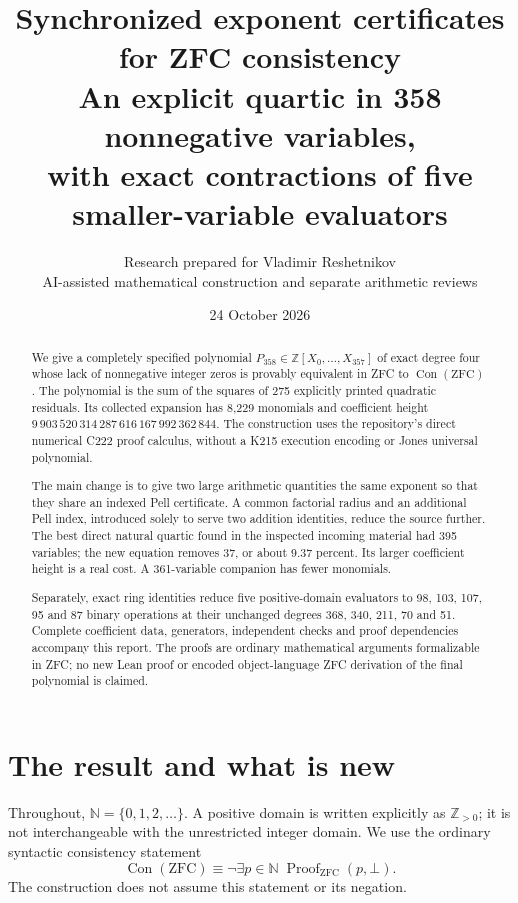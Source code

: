 \documentclass[11pt]{article}
\title{Synchronized exponent certificates\\for ZFC consistency\\[5pt]
\large An explicit quartic in 358 nonnegative variables,\\with exact contractions of five smaller-variable evaluators}
\author{Research prepared for Vladimir Reshetnikov\\
\small AI-assisted mathematical construction and separate arithmetic reviews}
\date{24 October 2026}
\theoremstyle{definition}\newtheorem{definition}[theorem]{Definition}
\newcommand{\N}{\mathbb N}\newcommand{\Z}{\mathbb Z}\newcommand{\Q}{\mathbb Q}
\newcommand{\Con}{\operatorname{Con}}\newcommand{\Refut}{\operatorname{Ref}}
\newcommand{\Pmain}{P_{358}}
\begin{document}
\maketitle
\begin{abstract}
We give a completely specified polynomial $\Pmain\in\Z[X_0,\ldots,X_{357}]$
of exact degree four whose lack of nonnegative integer zeros is provably
equivalent in ZFC to $\Con(\mathrm{ZFC})$. The polynomial is the sum of
the squares of 275 explicitly printed quadratic residuals. Its collected
expansion has 8,229 monomials and coefficient height
$9\,903\,520\,314\,287\,616\,167\,992\,362\,844$.
The construction uses the repository's direct numerical C222 proof
calculus, without a K215 execution encoding or Jones universal polynomial.

The main change is to give two large arithmetic quantities the same
exponent so that they share an indexed Pell certificate. A common
factorial radius and an additional Pell index, introduced solely to serve
two addition identities, reduce the source further. The best direct
natural quartic found in the inspected incoming material had 395 variables;
the new equation removes 37, or about 9.37 percent. Its larger coefficient
height is a real cost. A 361-variable companion has fewer monomials.

Separately, exact ring identities reduce five positive-domain evaluators
to 98, 103, 107, 95 and 87 binary operations at their unchanged degrees
368, 340, 211, 70 and 51. Complete coefficient data, generators, independent
checks and proof dependencies accompany this report. The proofs are
ordinary mathematical arguments formalizable in ZFC; no new Lean proof
or encoded object-language ZFC derivation of the final polynomial is claimed.
\end{abstract}
\clearpage
\tableofcontents
\newpage

\section{The result and what is new}
Throughout, $\N=\{0,1,2,\ldots\}$. A positive domain is written explicitly
as $\Z_{>0}$; it is not interchangeable with the unrestricted integer domain.
We use the ordinary syntactic consistency statement
\[
 \Con(\mathrm{ZFC})\equiv
 \neg\exists p\in\N\;\operatorname{Proof}_{\mathrm{ZFC}}(p,\bot).
\]
The construction does not assume this statement or its negation.
\end{document}
